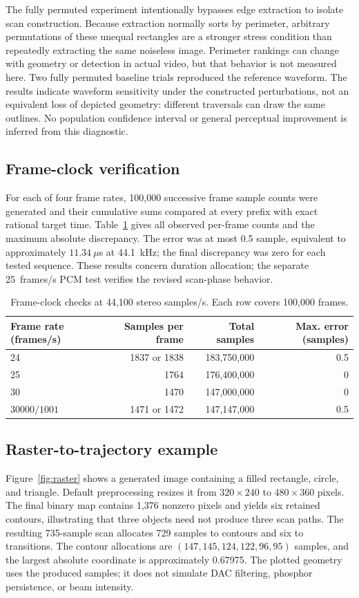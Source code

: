 \documentclass[11pt,a4paper]{article}
\begin{document}
The fully permuted experiment intentionally bypasses edge extraction to isolate scan construction. Because extraction normally sorts by perimeter, arbitrary permutations of these unequal rectangles are a stronger stress condition than repeatedly extracting the same noiseless image. Perimeter rankings can change with geometry or detection in actual video, but that behavior is not measured here. Two fully permuted baseline trials reproduced the reference waveform. The results indicate waveform sensitivity under the constructed perturbations, not an equivalent loss of depicted geometry: different traversals can draw the same outlines. No population confidence interval or general perceptual improvement is inferred from this diagnostic.

\subsection{Frame-clock verification}
For each of four frame rates, 100,000 successive frame sample counts were generated and their cumulative sums compared at every prefix with exact rational target time. Table~\ref{tab:timing} gives all observed per-frame counts and the maximum absolute discrepancy. The error was at most 0.5 sample, equivalent to approximately $11.34~\mu$s at 44.1~kHz; the final discrepancy was zero for each tested sequence. These results concern duration allocation; the separate 25~frames/s PCM test verifies the revised scan-phase behavior.

\begin{table}[t]
\centering\small
\caption{Frame-clock checks at 44,100 stereo samples/s. Each row covers 100,000 frames.}
\label{tab:timing}
\begin{tabular}{@{}lrrr@{}}
\toprule
Frame rate (frames/s) & Samples per frame & Total samples & Max. error (samples)\\\midrule
24 & 1837 or 1838 & 183,750,000 & 0.5\\
25 & 1764 & 176,400,000 & 0\\
30 & 1470 & 147,000,000 & 0\\
$30000/1001$ & 1471 or 1472 & 147,147,000 & 0.5\\\bottomrule
\end{tabular}
\end{table}

\subsection{Raster-to-trajectory example}
Figure~\ref{fig:raster} shows a generated image containing a filled rectangle, circle, and triangle. Default preprocessing resizes it from $320\times240$ to $480\times360$ pixels. The final binary map contains 1,376 nonzero pixels and yields six retained contours, illustrating that three objects need not produce three scan paths. The resulting 735-sample scan allocates 729 samples to contours and six to transitions. The contour allocations are $(147,145,124,122,96,95)$ samples, and the largest absolute coordinate is approximately 0.67975. The plotted geometry uses the produced samples; it does not simulate DAC filtering, phosphor persistence, or beam intensity.
\end{document}
